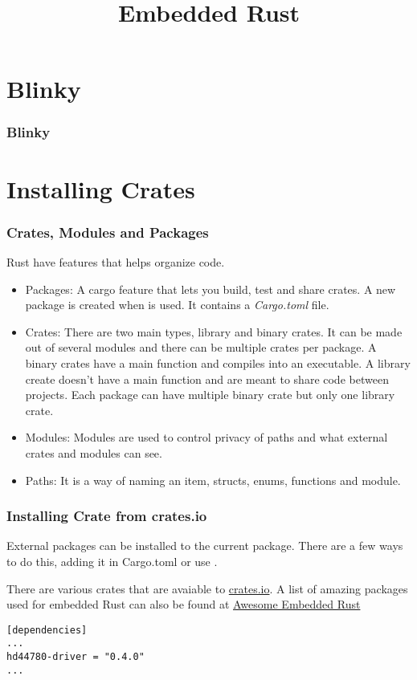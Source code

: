 \documentclass{beamer}
\title{Embedded Rust}
\begin{document}
\begin{frame}
  \titlepage{}
\end{frame}

\section{Blinky}
\begin{frame}
  \frametitle{Blinky}

\end{frame}

\section{Installing Crates}
\begin{frame}
  \frametitle{Crates, Modules and Packages}
  Rust have features that helps organize code.

  \begin{itemize}
    \item{Packages: A cargo feature that lets you build, test and share crates. A new package is created when  is used. It contains a \emph{Cargo.toml} file.}
    \item{Crates: There are two main types, library and binary crates. It can be made out of several modules and there can be multiple crates per package. A binary crates have a main function and compiles into an executable. A library create doesn't have a main function and are meant to share code between projects. Each package can have multiple binary crate but only one library crate.}
    \item{Modules: Modules are used to control privacy of paths and what external crates and modules can see.}
    \item{Paths: It is a way of naming an item, structs, enums, functions and module.}
  \end{itemize}
\end{frame}

\begin{frame}[fragile]
  \frametitle{Installing Crate from crates.io}
  External packages can be installed to the current package. There are a few ways to do this, adding it in Cargo.toml or use .

  There are various crates that are avaiable to \href{crates.io}{crates.io}. A list of amazing packages used for embedded Rust can also be found at \href{https://github.com/rust-embedded/awesome-embedded-rust}{Awesome Embedded Rust}

\begin{lstlisting}[caption={Adding Dependencies in Cargo.toml}]
[dependencies]
...
hd44780-driver = "0.4.0"
...
\end{lstlisting}
\end{frame}
\end{document}
